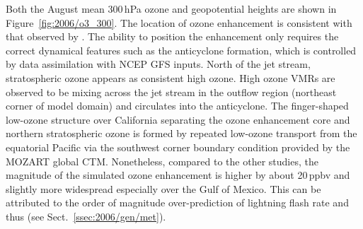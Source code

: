 Both the August mean 300\,\unit{hPa} ozone and geopotential heights are shown in Figure~\ref{fig:2006/o3_300}.
The location of ozone enhancement is consistent with that observed by \citet{Cooper:2007cr}. The ability to position the enhancement
only requires the correct dynamical features such as the anticyclone formation, which is controlled by data assimilation with NCEP
GFS inputs. North of the jet stream, stratospheric ozone appears as consistent high ozone. High ozone VMRs are observed to be mixing across
the jet stream in the outflow region (northeast corner of model domain) and circulates into the anticyclone. The finger-shaped low-ozone
structure over California separating the ozone enhancement core and northern stratospheric ozone is formed by repeated low-ozone transport from
the equatorial Pacific via the southwest corner boundary condition provided by the MOZART global CTM. Nonetheless, compared to the other studies,
the magnitude of the simulated ozone enhancement is higher by about 20\,\unit{ppbv} and slightly more widespread especially over the
Gulf of Mexico. This can be attributed to the order of magnitude over-prediction of lightning flash rate and thus {\lnox}
(see Sect.~\ref{ssec:2006/gen/met}).

